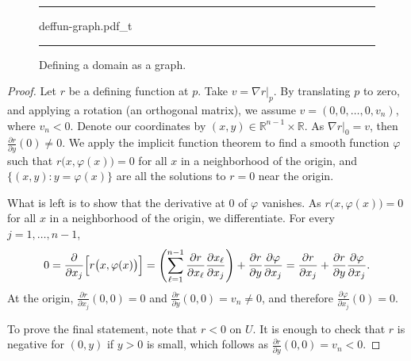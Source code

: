 \documentclass[12pt,openany]{book}
\newcommand{\R}{{\mathbb{R}}}
\theoremstyle{plain}
\theoremstyle{remark}
\theoremstyle{definition}
\newenvironment{myfig}{%
\begin{figure}[h!t]
\noindent\rule{\textwidth}{0.5pt}\vspace{12pt}\par\centering}%
{\par\noindent\rule{\textwidth}{0.5pt}
\end{figure}}
\theoremstyle{exercise}
\theoremstyle{example}
\begin{document}
\begin{myfig}
{deffun-graph.pdf_t}
\caption{Defining a domain as a graph.\label{fig:deffun-graph}}
\end{myfig}

\begin{proof}
Let $r$ be a defining function at $p$.  Take $v = \nabla r|_p$.
By translating $p$ to zero, and applying a rotation (an orthogonal matrix),
we assume $v = (0,0,\ldots,0,v_n)$, where $v_n < 0$.  Denote our
coordinates by $(x,y) \in \R^{n-1} \times \R$.  As $\nabla r|_0 =
v$, then $\frac{\partial r}{\partial y}(0) \not= 0$.  We apply 
the implicit function theorem to find a
smooth function $\varphi$ such that
$r\bigl(x,\varphi(x)\bigr) = 0$ for all $x$ in a neighborhood of the
origin, and $\bigl\{ (x,y) : y=\varphi(x) \bigr\}$ are all the
solutions to $r = 0$ near the origin.

What is left is to show that the derivative at 0 of $\varphi$ vanishes.
As
$r\bigl(x,\varphi(x)\bigr) = 0$ for all $x$ in a neighborhood of the
origin, we differentiate.
For every $j=1,\ldots,n-1$,
\begin{equation*}
0 = 
\frac{\partial}{\partial x_j} \Bigl[
r\bigl(x,\varphi(x)\bigr) 
\Bigr]
=
\left(
\sum_{\ell=1}^{n-1}
\frac{\partial r}{\partial x_\ell}
\frac{\partial x_\ell}{\partial x_j}
\right)
+
\frac{\partial r}{\partial y}
\frac{\partial \varphi}{\partial x_j}
=
\frac{\partial r}{\partial x_j}
+
\frac{\partial r}{\partial y}
\frac{\partial \varphi}{\partial x_j} .
\end{equation*}
At the origin,
$\frac{\partial r}{\partial x_j}(0,0) = 0$ and
$\frac{\partial r}{\partial y}(0,0) = v_n \not= 0$, and therefore
$\frac{\partial \varphi}{\partial x_j}(0) = 0$.

To prove the final statement, note that
$r < 0$ on $U$.  It is enough to check that $r$ is
negative for $(0,y)$ if $y > 0$ is small, which follows as $\frac{\partial
r}{\partial y}(0,0) = v_n < 0$.
\end{proof}
\end{document}
